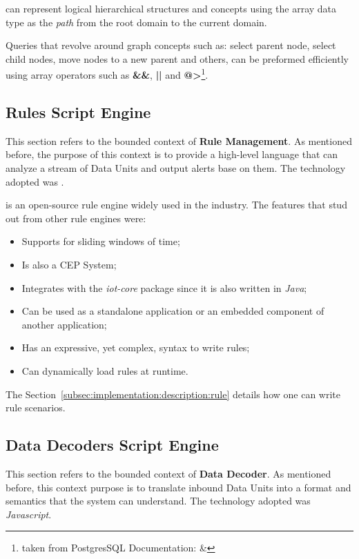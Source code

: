  can represent logical hierarchical structures and concepts using the array data type as the \textit{path} from the root domain to the current domain.

Queries that revolve around graph concepts such as: select parent node, select child nodes, move nodes to a new parent and others, can be preformed efficiently using array operators such as \textbf{\&\&}, \textbf{||} and \textbf{@>}\footnote{taken from PostgresSQL Documentation:  \& }.

\subsection{Rules Script Engine}
\label{subsec:implementation:decisions:drools}

This section refers to the bounded context of \textbf{Rule Management}. As mentioned before, the purpose of this context is to provide a high-level language that can analyze a stream of Data Units and output alerts base on them. The technology adopted was .

 is an open-source rule engine widely used in the industry. The features that stud out from other rule engines were:

\begin{itemize}
    \item Supports for sliding windows of time;
    \item Is also a \gls{CEP} System;
    \item Integrates with the \textit{iot-core} package since it is also written in \textit{Java};
    \item Can be used as a standalone application or an embedded component of another application;
    \item Has an expressive, yet complex, syntax to write rules; 
    \item Can dynamically load rules at runtime.
\end{itemize}

The Section~\ref{subsec:implementation:description:rule} details how one can write rule scenarios.

\subsection{Data Decoders Script Engine}
\label{subsec:implementation:decisions:js}

This section refers to the bounded context of \textbf{Data Decoder}. As mentioned before, this context purpose is to translate inbound Data Units into a format and semantics that the system can understand. The technology adopted was \textit{Javascript}.

